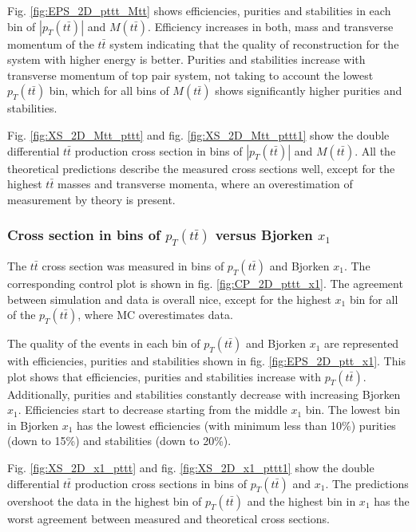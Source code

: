 Fig. \ref{fig:EPS_2D_pttt_Mtt} shows efficiencies, purities and stabilities in each bin of $|p_{T}(t\bar{t})|$ and $M(t\bar{t})$. Efficiency increases 
in both, mass and transverse momentum of the $t\bar{t}$ system indicating that the quality of reconstruction for the system with higher energy is better.
Purities and stabilities increase with transverse momentum of top pair system, not taking to account the lowest $p_{T}(t\bar{t})$ bin, which for all 
bins of $M(t\bar{t})$ shows significantly higher purities and stabilities.

Fig. \ref{fig:XS_2D_Mtt_pttt} and fig. \ref{fig:XS_2D_Mtt_pttt1} show the double differential $t\bar{t}$ production cross section in bins of $|p_{T}(t\bar{t})|$ and $M(t\bar{t})$.
All the theoretical predictions describe the measured cross sections well, except for the highest $t\bar{t}$ masses and transverse momenta, where an
overestimation of measurement by theory is present.

\subsubsection{Cross section in bins of $p_{T}(t\bar{t})$ versus Bjorken $x_{1}$}

The $t\bar{t}$ cross section was measured in bins of $p_{T}(t\bar{t})$ and Bjorken $x_{1}$.
The corresponding control plot is shown in fig. \ref{fig:CP_2D_pttt_x1}. The agreement between simulation and data is overall nice, except for the highest
$x_{1}$ bin for all of the $p_{T}(t\bar{t})$, where MC overestimates data.

The quality of the events in each bin of $p_{T}(t\bar{t})$ and Bjorken $x_{1}$ are represented with efficiencies, purities and stabilities shown in fig. \ref{fig:EPS_2D_ptt_x1}.
This plot shows that efficiencies, purities and stabilities increase with $p_{T}(t\bar{t})$. Additionally, purities and stabilities constantly decrease with 
increasing Bjorken $x_{1}$. Efficiencies start to decrease starting from the middle $x_{1}$ bin. The lowest bin in Bjorken $x_{1}$ has the lowest efficiencies
(with minimum less than 10\%) purities (down to 15\%) and stabilities (down to 20\%).

Fig. \ref{fig:XS_2D_x1_pttt} and fig. \ref{fig:XS_2D_x1_pttt1} show the double differential $t\bar{t}$ production cross sections in bins of $p_{T}(t\bar{t})$ and $x_{1}$.
The predictions overshoot the data in the highest bin of $p_{T}(t\bar{t})$ and the highest bin in $x_{1}$ has the worst agreement between measured and theoretical
cross sections.

